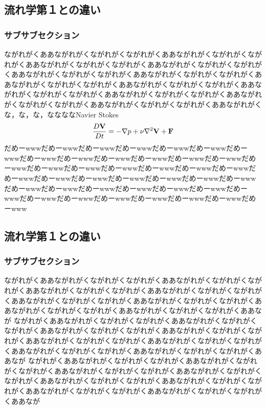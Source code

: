 \documentclass[uplatex,12pt]{jsbook}
\begin{document}
	\subsection{流れ学第１との違い}
	\subsubsection{サブサブセクション}
	ながれがくああながれがくながれがくながれがくああながれがくながれがくながれがくああながれがくながれがくながれがくああながれがくながれがくながれがくああながれがくながれがくながれがくああながれがくながれがくながれがくああながれがくながれがくながれがくああながれがくながれがくながれがくああながれがくながれがくながれがくああながれがくながれがくながれがくああながれがくながれがくながれがくああながれがくながれがくながれがくああながれがくな，な，な，ななななNavier Stokes
	\[
		\frac{D\bf V}{Dt} = -\nabla p + \nu\nabla^2\bf V + \bf F
	\]だめーwwwだめーwwwだめーwwwだめーwwwだめーwwwだめーwwwだめーwwwだめーwwwだめーwwwだめーwwwだめーwwwだめーwwwだめーwwwだめーwwwだめーwwwだめーwwwだめーwwwだめーwwwだめーwwwだめーwwwだめーwwwだめーwwwだめーwwwだめーwwwだめーwwwだめーwwwだめーwwwだめーwwwだめーwwwだめーwwwだめーwwwだめーwwwだめーwwwだめーwwwだめーwwwだめーwwwだめーwwwだめーwwwだめーwwwだめーwwwだめーwww
	\subsection{流れ学第１との違い}
	\subsubsection{サブサブセクション}
	ながれがくああながれがくながれがくながれがくああながれがくながれがくながれがくああながれがくながれがくながれがくああながれがくながれがくながれがくああながれがくながれがくながれがくああながれがくながれがくながれがくああながれがくながれがくながれがくああながれがくながれがくながれがくああなが
	ながれがくああながれがくながれがくながれがくああながれがくながれがくながれがくああながれがくながれがくながれがくああながれがくながれがくながれがくああながれがくながれがくながれがくああながれがくながれがくながれがくああながれがくながれがくながれがくああながれがくながれがくながれがくああなが
	ながれがくああながれがくながれがくながれがくああながれがくながれがくながれがくああながれがくながれがくながれがくああながれがくながれがくながれがくああながれがくながれがくながれがくああながれがくながれがくながれがくああながれがくながれがくながれがくああながれがくながれがくながれがくああなが
	
\end{document}
